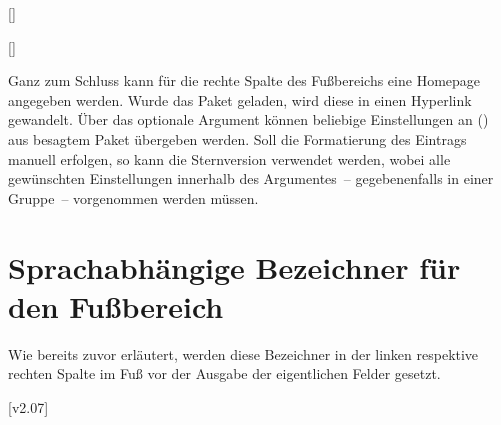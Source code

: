 \begin{DeclareEntity}{}
\begin{Declaration}
  {[]}
\begin{Declaration}
  {[]}
\printdeclarationlist

Ganz zum Schluss kann für die rechte Spalte des Fußbereichs eine Homepage 
angegeben werden. Wurde das Paket  geladen, wird diese in 
einen Hyperlink gewandelt. Über das optionale Argument können beliebige 
Einstellungen an () aus besagtem Paket 
übergeben werden. Soll die Formatierung des Eintrags manuell erfolgen, so kann 
die Sternversion  verwendet werden, wobei alle gewünschten 
Einstellungen innerhalb des Argumentes~-- gegebenenfalls in einer Gruppe~-- 
vorgenommen werden müssen.
\end{Declaration}
\end{Declaration}
%



\section{Sprachabhängige Bezeichner für den Fußbereich}

\begin{Declaration}
  {}
\begin{Declaration}
  {}
\begin{Declaration}
  {}
\printdeclarationlist[Bezeichner|!]

Wie bereits zuvor erläutert, werden diese Bezeichner in der linken respektive 
rechten Spalte im Fuß vor der Ausgabe der eigentlichen Felder gesetzt.
%
\end{Declaration}
\end{Declaration}
\end{Declaration}

[v2.07]
\end{DeclareEntity}
